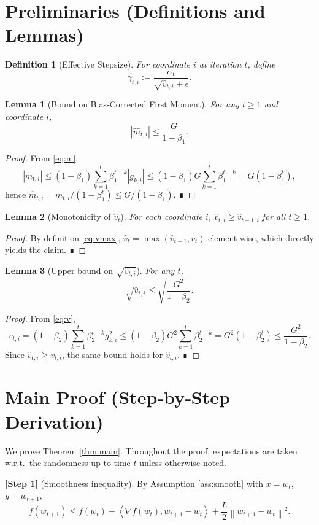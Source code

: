\documentclass{article}
\newtheorem{lemma}{Lemma}
\newtheorem{definition}{Definition}
\newcommand{\norm}[1]{\left\|#1\right\|}
\newcommand{\ip}[2]{\left\langle #1,#2\right\rangle}
\begin{document}
\section*{Preliminaries (Definitions and Lemmas)}
\begin{definition}[Effective Stepsize]
For coordinate $i$ at iteration $t$, define
\[
\gamma_{t,i}:= \frac{\alpha_t}{\sqrt{\hat v_{t,i}}+\epsilon}.
\]
\end{definition}
\begin{lemma}[Bound on Bias‑Corrected First Moment]\label{lem:m}
For any $t\ge1$ and coordinate $i$,
\[
| \hat m_{t,i} |\le \frac{G}{1-\beta_1}.
\]
\end{lemma}
\begin{proof}
From \eqref{eq:m},
\[
|m_{t,i}| \le (1-\beta_1)\sum_{k=1}^{t}\beta_1^{t-k}|g_{k,i}|
\le (1-\beta_1)G\sum_{k=1}^{t}\beta_1^{t-k}
= G(1-\beta_1^{t}),
\]
hence $\hat m_{t,i}=m_{t,i}/(1-\beta_1^{t})\le G/(1-\beta_1)$.  ∎
\end{proof}
\begin{lemma}[Monotonicity of $\hat v_t$]\label{lem:monotone}
For each coordinate $i$, $\hat v_{t,i}\ge \hat v_{t-1,i}$ for all $t\ge1$.
\end{lemma}
\begin{proof}
By definition \eqref{eq:vmax}, $\hat v_t = \max(\hat v_{t-1},v_t)$ element‑wise, which directly yields the claim. ∎
\end{proof}
\begin{lemma}[Upper bound on $\sqrt{\hat v_{t,i}}$]\label{lem:vbound}
For any $t$,
\[
\sqrt{\hat v_{t,i}} \le \sqrt{\frac{G^{2}}{1-\beta_2}}.
\]
\end{lemma}
\begin{proof}
From \eqref{eq:v},
\[
v_{t,i} = (1-\beta_2)\sum_{k=1}^{t}\beta_2^{t-k} g_{k,i}^{2}
\le (1-\beta_2) G^{2}\sum_{k=1}^{t}\beta_2^{t-k}
= G^{2}(1-\beta_2^{t})\le \frac{G^{2}}{1-\beta_2}.
\]
Since $\hat v_{t,i}\ge v_{t,i}$, the same bound holds for $\hat v_{t,i}$. ∎
\end{proof}

\section*{Main Proof (Step‑by‑Step Derivation)}
We prove Theorem \ref{thm:main}. Throughout the proof, expectations are taken w.r.t.\ the randomness up to time $t$ unless otherwise noted.

\bigskip
\noindent\textbf{[Step 1]} (Smoothness inequality).  
By Assumption \ref{ass:smooth} with $x=w_t$, $y=w_{t+1}$,
\begin{equation}
f(w_{t+1}) \le f(w_t) + \ip{\nabla f(w_t)}{w_{t+1}-w_t}
          + \frac{L}{2}\norm{w_{t+1}-w_t}^{2}. \label{eq:smooth}
\end{equation}
\end{document}
